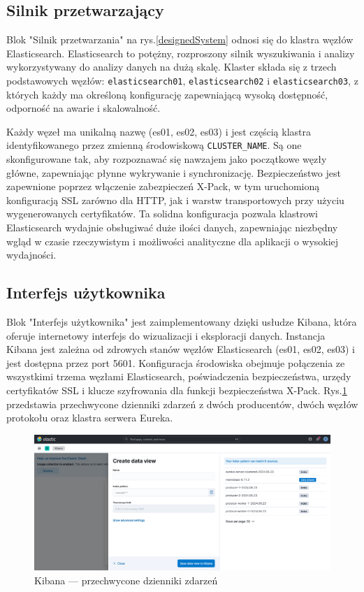 \subsection{Silnik przetwarzający}

Blok "Silnik przetwarzania" na rys.\ref{designedSystem} odnosi się do klastra węzłów Elasticsearch. Elasticsearch to potężny, rozproszony silnik wyszukiwania i analizy wykorzystywany do analizy danych na dużą skalę. Klaster składa się z trzech podstawowych węzłów: \verb|elasticsearch01|, \verb|elasticsearch02| i \verb|elasticsearch03|, z których każdy ma określoną konfigurację zapewniającą wysoką dostępność, odporność na awarie i skalowalność.

Każdy węzeł ma unikalną nazwę (es01, es02, es03) i jest częścią klastra identyfikowanego przez zmienną środowiskową \verb|CLUSTER_NAME|. Są one skonfigurowane tak, aby rozpoznawać się nawzajem jako początkowe węzły główne, zapewniając płynne wykrywanie i synchronizację. Bezpieczeństwo jest zapewnione poprzez włączenie zabezpieczeń X-Pack, w tym uruchomioną konfiguracją SSL zarówno dla HTTP, jak i warstw transportowych przy użyciu wygenerowanych certyfikatów. Ta solidna konfiguracja pozwala klastrowi Elasticsearch wydajnie obsługiwać duże ilości danych, zapewniając niezbędny wgląd w czasie rzeczywistym i możliwości analityczne dla aplikacji o wysokiej wydajności.

\subsection{Interfejs użytkownika}

Blok "Interfejs użytkownika" jest zaimplementowany dzięki usłudze Kibana, która oferuje internetowy interfejs do wizualizacji i eksploracji danych. Instancja Kibana jest zależna od zdrowych stanów węzłów Elasticsearch (es01, es02, es03) i jest dostępna przez port 5601. Konfiguracja środowiska obejmuje połączenia ze wszystkimi trzema węzłami Elasticsearch, poświadczenia bezpieczeństwa, urzędy certyfikatów SSL i klucze szyfrowania dla funkcji bezpieczeństwa X-Pack. Rys.\ref{kibanaDiscoveryDataView} przedstawia przechwycone dzienniki zdarzeń z dwóch producentów, dwóch węzłów protokołu oraz klastra serwera Eureka.

\begin{figure}[htbp!]
    \centering
    \includegraphics[width=\textwidth]{images/implementation/kibanaDiscoveryDataView.png}
    \caption{Kibana --- przechwycone dzienniki zdarzeń}
    \label{kibanaDiscoveryDataView}
\end{figure}

